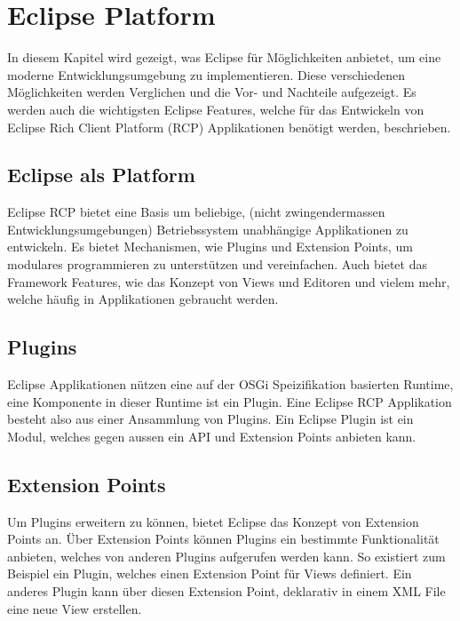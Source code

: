 \chapter{Eclipse Platform}
\label{sec:EclipsePlatform}

In diesem Kapitel wird gezeigt, was Eclipse für Möglichkeiten anbietet, um eine moderne Entwicklungsumgebung zu implementieren. Diese verschiedenen Möglichkeiten werden Verglichen und die Vor- und Nachteile aufgezeigt. Es werden auch die wichtigsten Eclipse Features, welche für das Entwickeln von Eclipse Rich Client Platform (RCP) Applikationen benötigt werden, beschrieben.

\section{Eclipse als Platform}

Eclipse RCP bietet eine Basis um beliebige, (nicht zwingendermassen Entwicklungsumgebungen) Betriebssystem unabhängige Applikationen zu entwickeln. Es bietet Mechanismen, wie Plugins und Extension Points, um modulares programmieren zu unterstützen und vereinfachen. Auch bietet das Framework Features, wie das Konzept von Views und Editoren und vielem mehr, welche häufig in Applikationen gebraucht werden.

\section{Plugins}

Eclipse Applikationen nützen eine auf der OSGi Speizifikation basierten Runtime, eine Komponente in dieser Runtime ist ein Plugin. Eine Eclipse RCP Applikation besteht also aus einer Ansammlung von Plugins. Ein Eclipse Plugin ist ein Modul, welches gegen aussen ein API und Extension Points anbieten kann. 

\section{Extension Points}

Um Plugins erweitern zu können, bietet Eclipse das Konzept von Extension Points an. Über Extension Points können Plugins ein bestimmte Funktionalität anbieten, welches von anderen Plugins aufgerufen werden kann. 
\newline
So existiert zum Beispiel ein Plugin, welches einen Extension Point für Views definiert. Ein anderes Plugin kann über diesen Extension Point, deklarativ in einem XML File eine neue View erstellen. \cite{extensionpoints}

